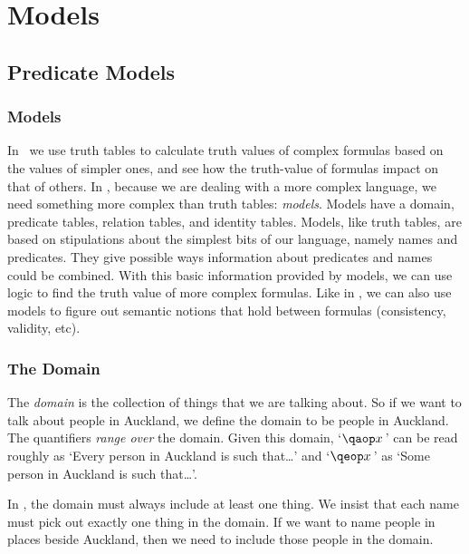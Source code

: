 \documentclass[PHIL101-Textbook.tex]{subfiles}
\begin{document}
\part{Models}\label{part:models}

\chapter{Predicate Models}\label{ch:pl-models}

\section{Models}

In \tfl\, we use truth tables to calculate truth values of complex formulas based on the values of simpler ones, and see how the truth-value of formulas impact on that of others. In \pl, because we are dealing with a more complex language, we need something more complex than truth tables: \emph{models}. 
Models have a domain, predicate tables, relation tables, and identity tables.
Models, like truth tables, are based on stipulations about the simplest bits of our language, namely names and predicates.
They give possible ways information about predicates and names could be combined.
With this basic information provided by models, we can use logic to find the truth value of
more complex formulas.
Like in \tfl, we can also use models to figure out semantic notions that hold between formulas (consistency, validity, etc). 


\section{The Domain}

The \emph{domain} is the collection of things that we are talking about. So if we want to talk about people in Auckland, we define the domain to be people in Auckland.
The quantifiers \emph{range over} the domain. Given this domain, `$\qa{x}$' can be read roughly as `Every person in Auckland is such that\ldots' and `$\qe{x}$' as `Some person in Auckland is such that\ldots'. 

In \pl, the domain must always include at least one thing. We insist that each name must pick out exactly one thing in the domain. If we want to name people in places beside Auckland, then we need to include those people in the domain. 
\end{document}
